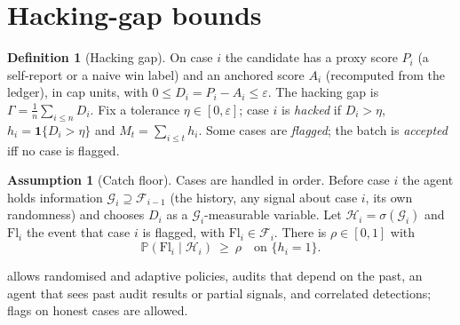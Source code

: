 \documentclass[11pt]{article}
\theoremstyle{definition}
\newtheorem{definition}[theorem]{Definition}
\newtheorem{assumption}[theorem]{Assumption}
\theoremstyle{remark}
\renewcommand{\P}{\mathbb{P}}
\newcommand{\F}{\mathcal{F}}
\newcommand{\G}{\mathcal{G}}
\newcommand{\1}{\mathbf{1}}
\newcommand{\eps}{\varepsilon}
\begin{document}
\section{Hacking-gap bounds}\label{sec:hacking}

\begin{definition}[Hacking gap]
On case $i$ the candidate has a proxy score $P_i$ (a self-report or a naive win label) and an anchored score $A_i$ (recomputed from the ledger), in cap units, with $0\le D_i=P_i-A_i\le\eps$. The hacking gap is $\Gamma=\frac1n\sum_{i\le n}D_i$. Fix a tolerance $\eta\in[0,\eps]$; case $i$ is \emph{hacked} if $D_i>\eta$, $h_i=\1\{D_i>\eta\}$ and $M_t=\sum_{i\le t}h_i$. Some cases are \emph{flagged}; the batch is \emph{accepted} iff no case is flagged.
\end{definition}

\begin{assumption}[Catch floor]\label{ass:R}
Cases are handled in order. Before case $i$ the agent holds information $\G_i\supseteq\F_{i-1}$ (the history, any signal about case $i$, its own randomness) and chooses $D_i$ as a $\G_i$-measurable variable. Let $\mathcal{H}_i=\sigma(\G_i)$ and $\mathrm{Fl}_i$ the event that case $i$ is flagged, with $\mathrm{Fl}_i\in\F_i$. There is $\rho\in[0,1]$ with
\[
\P(\mathrm{Fl}_i\mid\mathcal{H}_i)\ \ge\ \rho\quad\text{on }\{h_i=1\}.
\]
\end{assumption}

 allows randomised and adaptive policies, audits that depend on the past, an agent that sees past audit results or partial signals, and correlated detections; flags on honest cases are allowed.
\end{document}
